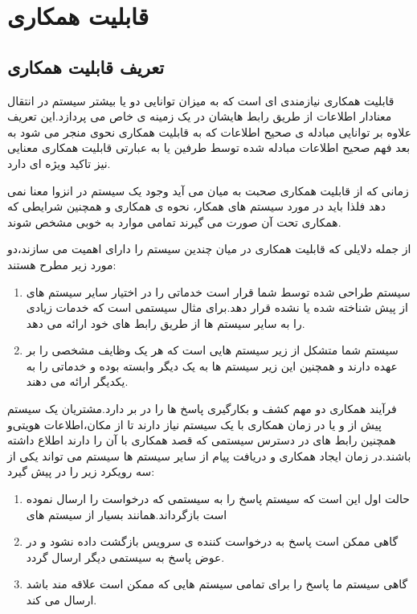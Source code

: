 \chapter{قابلیت همکاری}
\section{تعریف قابلیت همکاری}
قابلیت همکاری  نیازمندی ای است که به میزان توانایی دو یا بیشتر سیستم در انتقال معنادار اطلاعات از طریق رابط  هایشان در یک زمینه ی خاص می پردازد.این تعریف علاوه بر توانایی مبادله ی صحیح اطلاعات که به قابلیت همکاری نحوی  منجر می شود به بعد فهم صحیح اطلاعات مبادله شده توسط طرفین یا به عبارتی قابلیت همکاری معنایی  نیز تاکید ویژه ای دارد.

زمانی که از قابلیت همکاری صحبت به میان می آید وجود یک سیستم در انزوا معنا نمی دهد فلذا باید در مورد سیستم های همکار، نحوه ی همکاری و همچنین شرایطی که همکاری تحت آن صورت می گیرند تمامی موارد به خوبی مشخص شوند.

از جمله دلایلی که قابلیت همکاری در میان چندین سیستم را دارای اهمیت می سازند،‌دو مورد زیر مطرح هستند:
\begin{enumerate}
\item
سیستم طراحی شده توسط شما قرار است خدماتی را در اختیار سایر سیستم های از پیش شناخته شده یا نشده قرار دهد.برای مثال  سیستمی است که خدمات زیادی را به سایر سیستم ها از طریق رابط های خود ارائه می دهد.
\item
سیستم شما متشکل از زیر سیستم هایی است که هر یک وظایف مشخصی را بر عهده دارند و همچنین این زیر سیستم ها به یک دیگر وابسته بوده و خدماتی را به یکدیگر ارائه می دهند.
\end{enumerate}

فرآیند همکاری دو مهم کشف و بکارگیری پاسخ ها  را در بر دارد.مشتریان یک سیستم پیش از و یا در زمان همکاری با یک سیستم نیاز دارند تا از مکان‌،اطلاعات هویتی‌و همچنین رابط های در دسترس سیستمی که قصد همکاری با آن را دارند اطلاع داشته باشند.در زمان ایجاد همکاری و دریافت پیام از سایر سیستم ها سیستم می تواند یکی از سه رویکرد زیر را در پیش گیرد:
\begin{enumerate}
\item
حالت اول این است که سیستم پاسخ را به سیستمی که درخواست را ارسال نموده است بازگرداند.همانند بسیار از سیستم های 
\item
گاهی ممکن است پاسخ به درخواست کننده ی سرویس بازگشت داده نشود و در عوض پاسخ به سیستمی دیگر ارسال گردد.
\item
گاهی سیستم ما پاسخ را برای تمامی سیستم هایی که ممکن است علاقه مند باشد ارسال می کند.
\end{enumerate}

